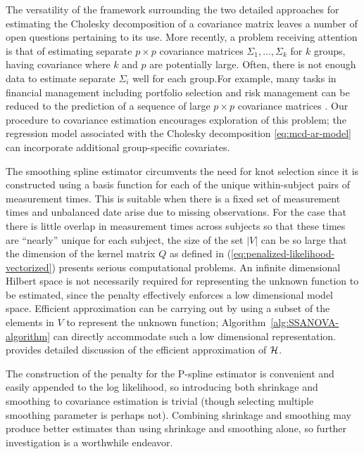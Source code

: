 \bigskip 


The versatility of the framework surrounding the two detailed approaches for estimating the Cholesky decomposition of a covariance matrix leaves a number of open questions pertaining to its use. More recently, a problem receiving attention is that of estimating separate $p\times p$ covariance matrices $\Sigma_1,\dots, \Sigma_k$ for $k$ groups, having covariance where $k$ and $p$ are potentially large. Often, there is not enough data to estimate separate $\Sigma_i$ well for each group.For example, many tasks in financial management including portfolio selection and risk management can be reduced to the prediction of a sequence of large $p \times p$ covariance matrices \citep{tsay2005analysis}. Our procedure to covariance estimation encourages exploration of this problem; the regression model associated with the Cholesky decomposition \eqref{eq:mcd-ar-model} can incorporate additional group-specific covariates. 

\bigskip

The smoothing spline estimator circumvents the need for knot selection since it is constructed using a basis function for each of the unique within-subject pairs of measurement times. This is suitable when there is a fixed set of measurement times and unbalanced date arise due to missing observations. For the case that there is little overlap in measurement times across subjects so that these times are ``nearly'' unique for each subject, the size of the set $\vert V \vert $ can be so large that the dimension of the kernel matrix $Q$ as defined in (\ref{eq:penalized-likelihood-vectorized}) presents serious computational problems. An infinite dimensional Hilbert space is not necessarily required for representing the unknown function to be estimated, since the penalty effectively enforces a low dimensional model space. Efficient approximation can be carrying out by using a subset of the elements in $V$ to represent the unknown function; Algorithm~\ref{alg:SSANOVA-algorithm} can directly accommodate such a low dimensional representation. \cite{kim2004smoothing} provides detailed discussion of the efficient approximation of $\mathcal{H}$.

\bigskip

The construction of the penalty for the P-spline estimator is convenient and easily appended to the log likelihood, so introducing both shrinkage and smoothing to covariance estimation is trivial (though selecting multiple smoothing parameter is perhaps not). Combining shrinkage and smoothing may produce better estimates than using shrinkage and smoothing alone, so further investigation is a worthwhile endeavor. 

